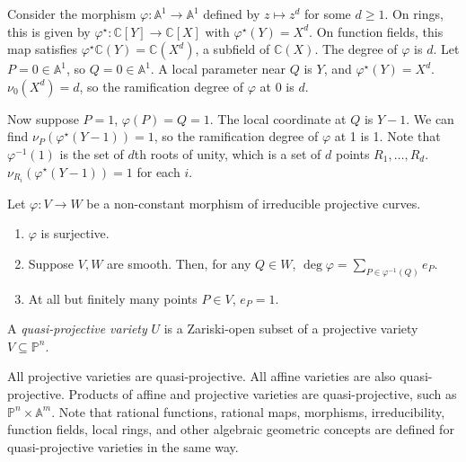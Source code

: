 \begin{example}
    Consider the morphism \( \varphi \colon \mathbb A^1 \to \mathbb A^1 \) defined by \( z \mapsto z^d \) for some \( d \geq 1 \).
    On rings, this is given by \( \varphi^\star \colon \mathbb C[Y] \to \mathbb C[X] \) with \( \varphi^\star(Y) = X^d \).
    On function fields, this map satisfies \( \varphi^\star \mathbb C(Y) = \mathbb C(X^d) \), a subfield of \( \mathbb C(X) \).
    The degree of \( \varphi \) is \( d \).
    Let \( P = 0 \in \mathbb A^1 \), so \( Q = 0 \in \mathbb A^1 \).
    A local parameter near \( Q \) is \( Y \), and \( \varphi^\star(Y) = X^d \).
    \( \nu_0(X^d) = d \), so the ramification degree of \( \varphi \) at \( 0 \) is \( d \).

    Now suppose \( P = 1 \), \( \varphi(P) = Q = 1 \).
    The local coordinate at \( Q \) is \( Y - 1 \).
    We can find \( \nu_P(\varphi^\star(Y - 1)) = 1 \), so the ramification degree of \( \varphi \) at 1 is 1.
    Note that \( \varphi^{-1}(1) \) is the set of \( d \)th roots of unity, which is a set of \( d \) points \( R_1, \dots, R_d \).
    \( \nu_{R_i}(\varphi^\star(Y - 1)) = 1\) for each \( i \).
\end{example}
\begin{theorem}
    Let \( \varphi \colon V \to W \) be a non-constant morphism of irreducible projective curves.
    \begin{enumerate}
        \item \( \varphi \) is surjective.
        \item Suppose \( V, W \) are smooth.
        Then, for any \( Q \in W \), \( \deg \varphi = \sum_{P \in \varphi^{-1}(Q)}e_P \).
        \item At all but finitely many points \( P \in V \), \( e_P = 1 \).
    \end{enumerate}
\end{theorem}
\begin{definition}
    A \emph{quasi-projective variety} \( U \) is a Zariski-open subset of a projective variety \( V \subseteq \mathbb P^n \).
\end{definition}
\begin{example}
    All projective varieties are quasi-projective.
    All affine varieties are also quasi-projective.
    Products of affine and projective varieties are quasi-projective, such as \( \mathbb P^n \times \mathbb A^m \).
    Note that rational functions, rational maps, morphisms, irreducibility, function fields, local rings, and other algebraic geometric concepts are defined for quasi-projective varieties in the same way.
\end{example}
